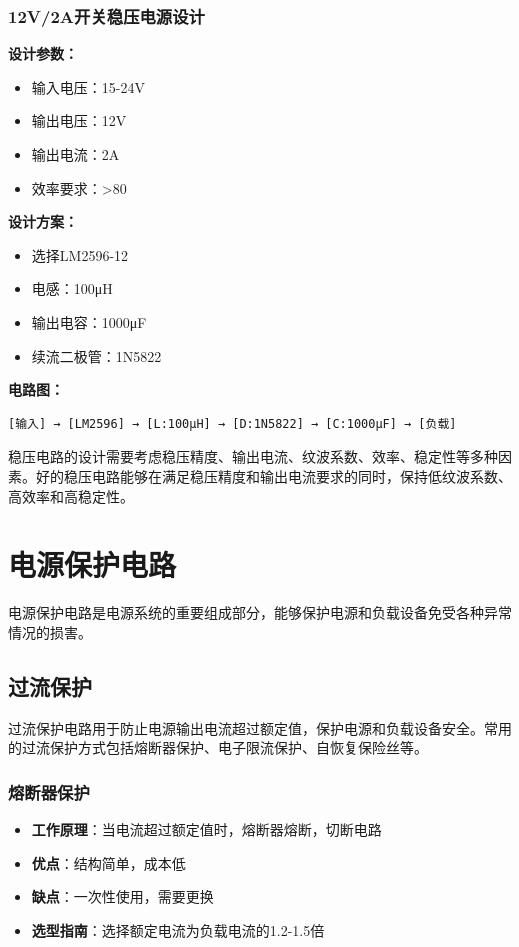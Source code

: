 \documentclass[12pt,UTF8]{ctexbook}
\begin{document}
\subsubsection{12V/2A开关稳压电源设计}

\textbf{设计参数：}
\begin{itemize}
    \item 输入电压：15-24V
    \item 输出电压：12V
    \item 输出电流：2A
    \item 效率要求：>80%
\end{itemize}

\textbf{设计方案：}
\begin{itemize}
    \item 选择LM2596-12
    \item 电感：100μH
    \item 输出电容：1000μF
    \item 续流二极管：1N5822
\end{itemize}

\textbf{电路图：}

\begin{verbatim}
[输入] → [LM2596] → [L:100μH] → [D:1N5822] → [C:1000μF] → [负载]
\end{verbatim}

稳压电路的设计需要考虑稳压精度、输出电流、纹波系数、效率、稳定性等多种因素。好的稳压电路能够在满足稳压精度和输出电流要求的同时，保持低纹波系数、高效率和高稳定性。

\section{电源保护电路}

电源保护电路是电源系统的重要组成部分，能够保护电源和负载设备免受各种异常情况的损害。

\subsection{过流保护}

过流保护电路用于防止电源输出电流超过额定值，保护电源和负载设备安全。常用的过流保护方式包括熔断器保护、电子限流保护、自恢复保险丝等。

\subsubsection{熔断器保护}
\begin{itemize}
    \item \textbf{工作原理}：当电流超过额定值时，熔断器熔断，切断电路
    \item \textbf{优点}：结构简单，成本低
    \item \textbf{缺点}：一次性使用，需要更换
    \item \textbf{选型指南}：选择额定电流为负载电流的1.2-1.5倍
\end{itemize}
\end{document}
